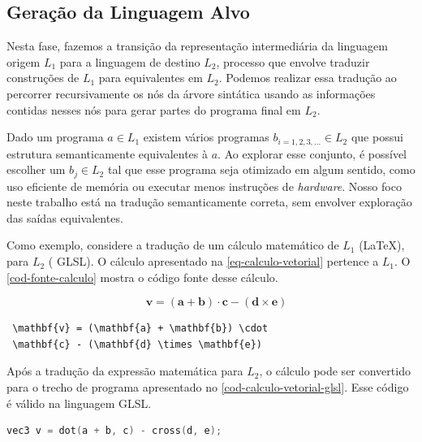 \documentclass[english, 
               brazil, 
               bsc] %
               {dcomp-abntex2}
\begin{document}
\subsection{Geração da Linguagem Alvo} \label{codegen}

Nesta fase, fazemos a transição da representação intermediária  da linguagem origem \( L_1 \)  para  a linguagem de destino \( L_2 \), processo que envolve traduzir construções de \( L_1 \) para equivalentes em $L_2$. Podemos realizar essa tradução ao percorrer recursivamente os nós da árvore sintática usando as informações contidas nesses nós para gerar partes do programa final em $L_2$.

Dado um programa $a \in L_1$ existem vários programas $b_{i=1,2,3,...} \in L_2$ que possui estrutura semanticamente equivalentes à $a$. Ao explorar esse conjunto, é possível escolher um $b_j \in L_2$ tal que esse programa seja otimizado em algum sentido, como uso eficiente de memória ou executar menos instruções de \textit{hardware}. Nosso foco neste trabalho está na tradução semanticamente correta, sem envolver exploração das saídas  equivalentes.

Como exemplo, considere a tradução de um cálculo matemático de \( L_1 \) (\LaTeX), para \( L_2 \) ( GLSL). O cálculo apresentado na \autoref{eq-calculo-vetorial} pertence a $L_1$. O \autoref{cod-fonte-calculo} mostra o código fonte desse cálculo. 


\begin{equation} \label{eq-calculo-vetorial}
 \quad \mathbf{v} = (\mathbf{a} + \mathbf{b}) \cdot
 \mathbf{c} - (\mathbf{d} \times \mathbf{e})
\end{equation}

\begin{codigo}
\caption{\small Cálculo vetorial em código fonte \LaTeX}
  \label{cod-fonte-calculo}
\begin{lstlisting}
 \mathbf{v} = (\mathbf{a} + \mathbf{b}) \cdot
 \mathbf{c} - (\mathbf{d} \times \mathbf{e})
\end{lstlisting}
\end{codigo}



Após a tradução da expressão matemática para \( L_2 \), o cálculo pode ser convertido para o trecho de programa apresentado no \autoref{cod-calculo-vetorial-glsl}. Esse código é válido na linguagem GLSL.

\begin{codigo}
\caption{\small Cálculo vetorial em código GLSL}
\label{cod-calculo-vetorial-glsl}
\begin{lstlisting}[language = C]
    vec3 v = dot(a + b, c) - cross(d, e);
\end{lstlisting}
\end{codigo}
\end{document}
